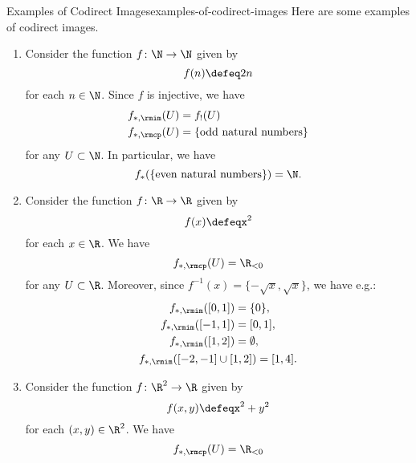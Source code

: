 \begin{example}{Examples of Codirect Images}{examples-of-codirect-images}%
    Here are some examples of codirect images.
    \begin{enumerate}
        \item\label{examples-of-codirect-images-multiplication-by-two}Consider the function $f\colon\N\to\N$ given by
            \[
                f(n)
                \defeq
                2n
            \]%
            for each $n\in\N$. Since $f$ is injective, we have
            \begin{align*}
                f_{*,\rmim}(U) &= f_{!}(U)\\
                f_{*,\rmcp}(U) &= \{\text{odd natural numbers}\}
            \end{align*}
            for any $U\subset\N$. In particular, we have
            \[
                f_{*}(\{\text{even natural numbers}\})%
                =%
                \N.%
            \]%
        \item\label{examples-of-codirect-images-parabolas}Consider the function $f\colon\R\to\R$ given by
            \[
                f(x)%
                \defeq%
                x^{2}
            \]%
            for each $x\in\R$. We have
            \[
                f_{*,\rmcp}(U)%
                =%
                \R_{<0}
            \]%
            for any $U\subset\R$. Moreover, since $f^{-1}(x)=\{-\sqrt{x},\sqrt{x}\}$, we have e.g.:
            \begin{gather*}
                \begin{aligned}
                    f_{*,\rmim}([0,1])        &= \{0\},\\
                    f_{*,\rmim}([-1,1])       &= [0,1],\\
                    f_{*,\rmim}([1,2])        &= \emptyset,
                \end{aligned}
                \\
                f_{*,\rmim}([-2,-1]\cup[1,2])  = [1,4].
            \end{gather*}
        \item\label{examples-of-codirect-images-circles}Consider the function $f\colon\R^{2}\to\R$ given by
            \[
                f(x,y)%
                \defeq%
                x^{2}+y^{2}
            \]%
            for each $(x,y)\in\R^{2}$. We have
            \[
                f_{*,\rmcp}(U)%
                =%
                \R_{<0}
\]
\end{enumerate}
\end{example}
